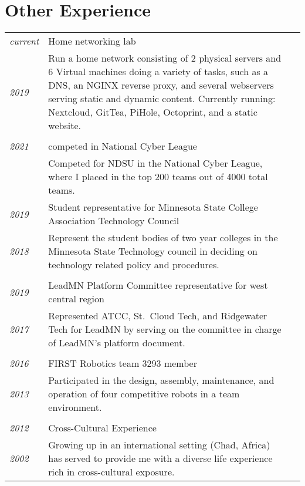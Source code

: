 \documentclass[letterpaper,10pt]{article}
\begin{document}
\section*{Other Experience}
	\begin{tabular}{R{2cm}|p{14cm}}
	\textsl{current} & Home networking lab\\
	\textsl{2019} & Run a home network consisting of 2 physical servers and 6 Virtual machines doing a variety of tasks, such as a DNS, an NGINX reverse proxy, and several webservers serving static and dynamic content. Currently running: Nextcloud, GitTea, PiHole, Octoprint, and a static website.\\
	\\
	\textsl{2021} & competed in National Cyber League\\
	& Competed for NDSU in the National Cyber League, where I placed in the top 200 teams out of 4000 total teams.
	\\
	\textsl{2019} & Student representative for Minnesota State College Association Technology Council\\
	\textsl{2018} & Represent the student bodies of two year colleges in the Minnesota State Technology council in deciding on technology related policy and procedures.\\
	\\
	\textsl{2019} & LeadMN Platform Committee representative for west central region\\
	\textsl{2017} & Represented ATCC, St.\ Cloud Tech, and Ridgewater Tech for LeadMN by serving on the committee in charge of LeadMN's platform document.\\
	\\
	\textsl{2016} & FIRST Robotics team 3293 member\\
	\textsl{2013} & Participated in the design, assembly, maintenance, and operation of four competitive robots in a team environment.\\
	\\
	\textsl{2012} & Cross-Cultural Experience\\
	\textsl{2002} &Growing up in an international setting (Chad, Africa) has served to provide me with a diverse life experience rich in cross-cultural exposure.\\
	\end{tabular}
\end{document}
